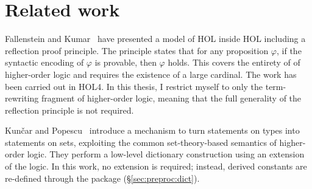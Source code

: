 
\section{Related work}

Fallenstein and Kumar~\cite{fallenstein2015reflection} have presented a model of HOL inside HOL including a reflection proof principle.
The principle states that for any proposition $\varphi$, if the syntactic encoding of $\varphi$ is provable, then $\varphi$ holds.
This covers the entirety of of higher-order logic and requires the existence of a large cardinal.
The work has been carried out in HOL4.
In this thesis, I restrict myself to only the term-rewriting fragment of higher-order logic, meaning that the full generality of the reflection principle is not required.

Kunčar and Popescu~\cite{kuncar2018consistent,kuncar2018types} introduce a mechanism to turn statements on types into statements on sets, exploiting the common set-theory-based semantics of higher-order logic.
They perform a low-level dictionary construction using an extension of the logic.
In this work, no extension is required; instead, derived constants are re-defined through the  package (§\ref{sec:preproc:dict}).